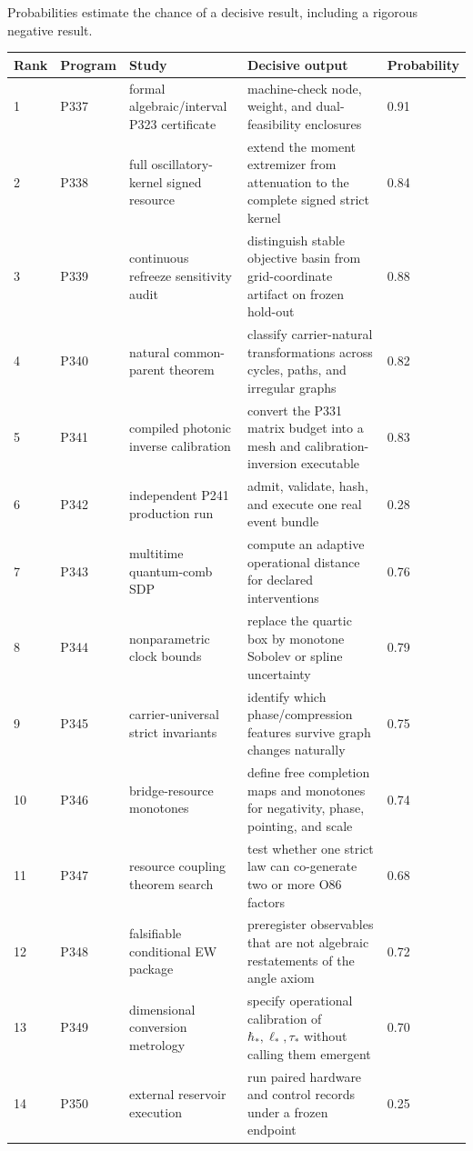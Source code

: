 \documentclass[11pt,a4paper,openany]{report}
\begin{document}
Probabilities estimate the chance of a decisive result, including a rigorous negative result.

\begin{center}
\begingroup\fontsize{7}{8.4}\selectfont
\setlength{\tabcolsep}{2.5pt}
\renewcommand{\arraystretch}{1.16}
\begin{longtable}{@{}p{}p{}p{}p{}p{}@{}}
\toprule
\textbf{Rank} & \textbf{Program} & \textbf{Study} & \textbf{Decisive output} & \textbf{Probability} \\
\midrule
\endhead
1 & P337 & formal algebraic/\allowbreak{}interval P323 certificate & machine-check node, weight, and dual-feasibility enclosures & 0.91 \\
2 & P338 & full oscillatory-kernel signed resource & extend the moment extremizer from attenuation to the complete signed strict kernel & 0.84 \\
3 & P339 & continuous refreeze sensitivity audit & distinguish stable objective basin from grid-coordinate artifact on frozen hold-out & 0.88 \\
4 & P340 & natural common-parent theorem & classify carrier-natural transformations across cycles, paths, and irregular graphs & 0.82 \\
5 & P341 & compiled photonic inverse calibration & convert the P331 matrix budget into a mesh and calibration-inversion executable & 0.83 \\
6 & P342 & independent P241 production run & admit, validate, hash, and execute one real event bundle & 0.28 \\
7 & P343 & multitime quantum-comb SDP & compute an adaptive operational distance for declared interventions & 0.76 \\
8 & P344 & nonparametric clock bounds & replace the quartic box by monotone Sobolev or spline uncertainty & 0.79 \\
9 & P345 & carrier-universal strict invariants & identify which phase/\allowbreak{}compression features survive graph changes naturally & 0.75 \\
10 & P346 & bridge-resource monotones & define free completion maps and monotones for negativity, phase, pointing, and scale & 0.74 \\
11 & P347 & resource coupling theorem search & test whether one strict law can co-generate two or more O86 factors & 0.68 \\
12 & P348 & falsifiable conditional EW package & preregister observables that are not algebraic restatements of the angle axiom & 0.72 \\
13 & P349 & dimensional conversion metrology & specify operational calibration of \(\hbar_*,\ell_*,\tau_*\) without calling them emergent & 0.70 \\
14 & P350 & external reservoir execution & run paired hardware and control records under a frozen endpoint & 0.25 \\
\bottomrule
\end{longtable}
\endgroup
\end{center}
\end{document}
